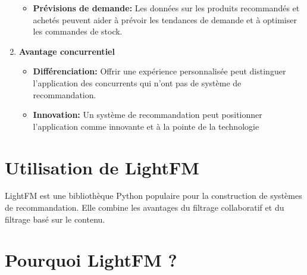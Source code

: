 \documentclass[edit,12pt,a4paper,ChapStyle,oneside,doubleinterligne]{report}
\begin{document}
\begin{enumerate}
\begin{itemize}
        \item \textbf{Prévisions de demande: }Les données sur les produits recommandés et achetés peuvent aider à prévoir les tendances de demande et à optimiser les commandes de stock.
    \end{itemize}
    \item \textbf{Avantage concurrentiel} \begin{itemize}
        \item \textbf{Différenciation: }Offrir une expérience personnalisée peut distinguer l'application des concurrents qui n'ont pas de système de recommandation.
        \item \textbf{Innovation: }Un système de recommandation peut positionner l'application comme innovante et à la pointe de la technologie
    \end{itemize}
\end{enumerate}
\section{Utilisation de LightFM}
LightFM est une bibliothèque Python populaire pour la construction de systèmes de recommandation. Elle combine les avantages du filtrage collaboratif et du filtrage basé sur le contenu.
\section{Pourquoi LightFM ?}
\end{document}
